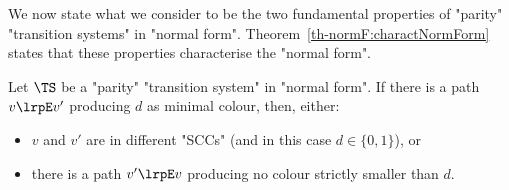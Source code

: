 \documentclass{theoretics}
\begin{document}
We now state what we consider to be the two fundamental properties of "parity" "transition systems" in "normal form". Theorem~\ref{th-normF:charactNormForm} states that these properties characterise the "normal form".


\begin{proposition}\label{prop-normF:paths_form_parity}
	Let $\TS$ be a "parity" "transition system" in "normal form". If there is a path $v\lrpE v'$ producing $d$ as minimal colour, then, either:
	\begin{itemize}	
		\item $v$ and $v'$ are in different "SCCs" (and in this case $d\in \{0,1\}$), or
		\item there is a path  $v'\lrpE v$ producing no colour strictly smaller than $d$.
	\end{itemize} 
\end{proposition}
\end{document}
